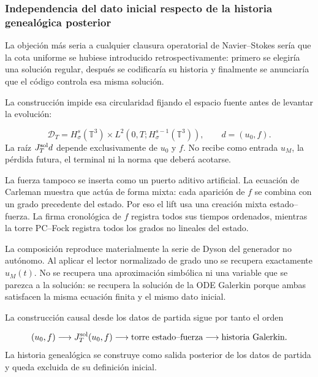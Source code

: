 \subsubsection{Independencia del dato inicial respecto de la historia genealógica posterior}
La objeción más seria a cualquier clausura operatorial de Navier–Stokes sería que la cota uniforme se hubiese introducido retrospectivamente: primero se elegiría una solución regular, después se codificaría su historia y finalmente se anunciaría que el código controla esa misma solución.\par
La construcción impide esa circularidad fijando el espacio fuente antes de levantar la evolución:\par
\[
\mathcal D_T
=
H^s_\sigma(\mathbb T^3)
\times
L^2(0,T;H^{s-1}_\sigma(\mathbb T^3)),
\qquad
d=(u_0,f).
\]
La raíz \(J_T^{\rm sol}d\) depende exclusivamente de \(u_0\) y \(f\). No recibe como entrada \(u_M\), la pérdida futura, el terminal ni la norma que deberá acotarse.\par
La fuerza tampoco se inserta como un puerto aditivo artificial. La ecuación de Carleman muestra que actúa de forma mixta: cada aparición de \(f\) se combina con un grado precedente del estado. Por eso el lift usa una creación mixta estado–fuerza. La firma cronológica de \(f\) registra todos sus tiempos ordenados, mientras la torre PC–Fock registra todos los grados no lineales del estado.\par
La composición reproduce materialmente la serie de Dyson del generador no autónomo. Al aplicar el lector normalizado de grado uno se recupera exactamente \(u_M(t)\). No se recupera una aproximación simbólica ni una variable que se parezca a la solución: se recupera la solución de la ODE Galerkin porque ambas satisfacen la misma ecuación finita y el mismo dato inicial.\par
La construcción causal desde los datos de partida sigue por tanto el orden\par
\[
(u_0,f)
\longrightarrow
J_T^{\rm sol}(u_0,f)
\longrightarrow
\text{torre estado–fuerza}
\longrightarrow
\text{historia Galerkin}.
\]
La historia genealógica se construye como salida posterior de los datos de partida y queda excluida de su definición inicial.\par
{}
